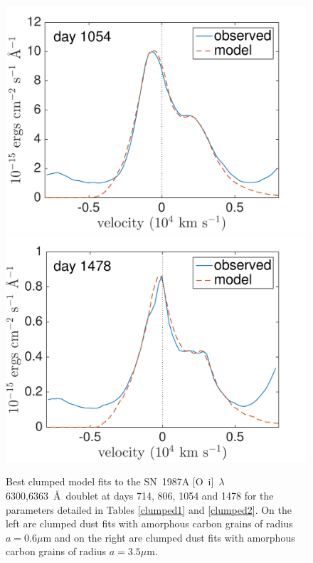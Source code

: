 \begin{figure}
\includegraphics[trim =0 0 0 0,clip=true,scale=0.37]{chapters/chapter5/images/clump_1/maximum/d1054OI.pdf}
\hspace{0mm}
\includegraphics[trim =0 0 0 0,clip=true,scale=0.37]{chapters/chapter5/images/clump_1/maximum/d1478OI_new.pdf}


\caption{Best clumped model fits to the SN~1987A [O~{\sc i}]~$\lambda$6300,6363~\AA\ doublet at days 714, 806, 1054 and 1478 for the parameters detailed in Tables \ref{clumped1} and \ref{clumped2}.  On the left are clumped dust fits with amorphous carbon grains of radius $a=0.6 \mu$m and on the right are clumped dust fits with amorphous carbon grains of radius $a=3.5 \mu$m.}
\label{OI_smooth}

\end{figure}

